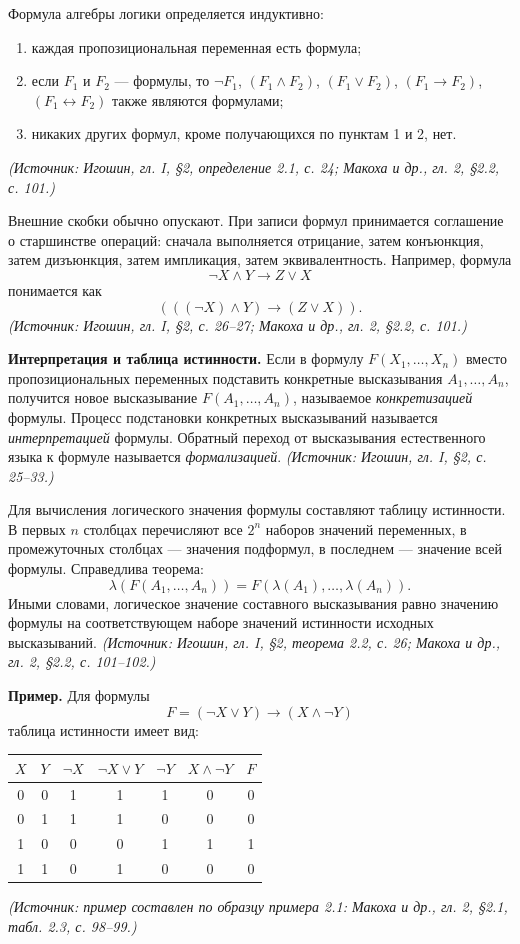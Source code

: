 \documentclass[a4paper,12pt]{article}
\begin{document}
Формула алгебры логики определяется индуктивно:
\begin{enumerate}[label=\arabic*)]
\item каждая пропозициональная переменная есть формула;
\item если \(F_1\) и \(F_2\) — формулы, то \(\neg F_1\), \((F_1\land F_2)\), \((F_1\lor F_2)\), \((F_1\to F_2)\), \((F_1\leftrightarrow F_2)\) также являются формулами;
\item никаких других формул, кроме получающихся по пунктам 1 и 2, нет.
\end{enumerate}
\textit{(Источник: Игошин, гл. I, §2, определение 2.1, с. 24; Макоха и др., гл. 2, §2.2, с. 101.)}

Внешние скобки обычно опускают. При записи формул принимается соглашение о старшинстве операций: сначала выполняется отрицание, затем конъюнкция, затем дизъюнкция, затем импликация, затем эквивалентность. Например, формула
\[
\neg X\land Y\to Z\lor X
\]
понимается как
\[
(((\neg X)\land Y)\to(Z\lor X)).
\]
\textit{(Источник: Игошин, гл. I, §2, с. 26--27; Макоха и др., гл. 2, §2.2, с. 101.)}

\textbf{Интерпретация и таблица истинности.} Если в формулу \(F(X_1,\ldots,X_n)\) вместо пропозициональных переменных подставить конкретные высказывания \(A_1,\ldots,A_n\), получится новое высказывание \(F(A_1,\ldots,A_n)\), называемое \emph{конкретизацией} формулы. Процесс подстановки конкретных высказываний называется \emph{интерпретацией} формулы. Обратный переход от высказывания естественного языка к формуле называется \emph{формализацией}.
\textit{(Источник: Игошин, гл. I, §2, с. 25--33.)}

Для вычисления логического значения формулы составляют таблицу истинности. В первых \(n\) столбцах перечисляют все \(2^n\) наборов значений переменных, в промежуточных столбцах — значения подформул, в последнем — значение всей формулы. Справедлива теорема:
\[
\lambda(F(A_1,\ldots,A_n))
=
F(\lambda(A_1),\ldots,\lambda(A_n)).
\]
Иными словами, логическое значение составного высказывания равно значению формулы на соответствующем наборе значений истинности исходных высказываний.
\textit{(Источник: Игошин, гл. I, §2, теорема 2.2, с. 26; Макоха и др., гл. 2, §2.2, с. 101--102.)}

\textbf{Пример.} Для формулы
\[
F=(\neg X\lor Y)\to(X\land\neg Y)
\]
таблица истинности имеет вид:
\begin{center}
\begin{tabular}{cc|ccccc}
\toprule
\(X\) & \(Y\) & \(\neg X\) & \(\neg X\lor Y\) & \(\neg Y\) & \(X\land\neg Y\) & \(F\)\\
\midrule
0 & 0 & 1 & 1 & 1 & 0 & 0\\
0 & 1 & 1 & 1 & 0 & 0 & 0\\
1 & 0 & 0 & 0 & 1 & 1 & 1\\
1 & 1 & 0 & 1 & 0 & 0 & 0\\
\bottomrule
\end{tabular}
\end{center}
\textit{(Источник: пример составлен по образцу примера 2.1: Макоха и др., гл. 2, §2.1, табл. 2.3, с. 98--99.)}
\end{document}
